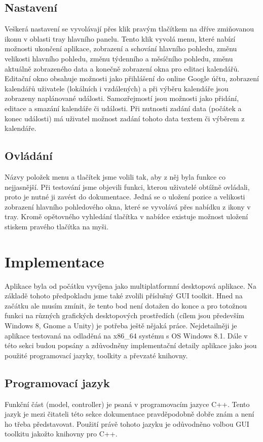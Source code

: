 \documentclass[a4paper, 12pt]{article}[7.12.2013]
\begin{document}
\subsection{Nastavení}
Veškerá nastavení se vyvolávají přes klik pravým tlačítkem na dříve zmiňovanou ikonu v oblasti tray hlavního panelu. Tento klik vyvolá menu, které nabízí možnosti ukončení aplikace, zobrazení a schování hlavního pohledu, změnu velikosti hlavního pohledu, změnu týdenního a měsíčního pohledu, změnu aktuálně zobrazeného data a konečně zobrazení okna pro editaci kalendářů. Editační okno obsahuje možnosti jako přihlášení do online Google účtu, zobrazení kalendářů uživatele (lokálních i vzdálených) a při výběru kalendáře jsou zobrazeny naplánované události. Samozřejmostí jsou možnosti jako přidání, editace a smazání kalendáře či události. Při nutnosti zadání data (počátek a konec události) má uživatel možnost zadání tohoto data textem či výběrem z kalendáře.

\subsection{Ovládání}
Názvy položek menu a tlačítek jsme volili tak, aby z něj byla funkce co nejjasnější. Při testování jsme objevili funkci, kterou uživatelé obtížně ovládali, proto je nutné ji zavést do dokumentace. Jedná se o uložení pozice a velikosti zobrazení hlavního pohledového okna, které se vyvolává přes nabídku z ikony v tray. Kromě opětovného vyhledání tlačítka v nabídce existuje možnost uložení stiskem pravého tlačítka na myši.
\section{Implementace} \label{implementace}
Aplikace byla od počátku vyvíjena jako multiplatformní desktopová aplikace. Na základě tohoto předpokladu jsme také zvolili příslušný GUI toolkit. Hned na začátku ale musím zmínit, že tento bod není dotažen do konce a pro totožnou funkci na různých grafických desktopových prostředích (cílem jsou především Windows 8, Gnome a Unity) je potřeba ještě nějaká práce. Nejdetailněji je aplikace testovaná na odladěná na x86\_64 systému s OS Windows 8.1. Dále v této sekci budou popsány a zdůvodněny implementační detaily aplikace jako jsou použité programovací jazyky, toolkity a převzaté knihovny.

\subsection{Programovací jazyk}
Funkční část (model, controller) je psaná v programovacím jazyce C++. Tento jazyk je mezi čitateli této sekce dokumentace pravděpodobně dobře znám a není ho třeba představovat. Použití právě tohoto jazyku je odůvodněno volbou GUI toolkitu jakožto knihovny pro C++.
\end{document}
